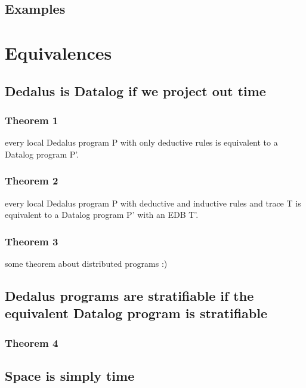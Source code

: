 \documentclass{acm_proc_article-sp-sigmod09}
\begin{document}
\subsection{Examples}

\section{Equivalences}

\subsection{Dedalus is Datalog if we project out time}

\subsubsection{Theorem 1}

\newtheorem{foo}{bar bas bat}
every local Dedalus program P with only deductive rules is equivalent to a Datalog program P'.

\subsubsection{Theorem 2}

every local Dedalus program P with deductive and inductive rules and trace T is equivalent to a Datalog program P' with an EDB T'.

\subsubsection{Theorem 3}

some theorem about distributed programs :)

\subsection{Dedalus programs are stratifiable if the equivalent Datalog program is stratifiable}

\subsubsection{Theorem 4}

\subsection{Space is simply time}
\end{document}
